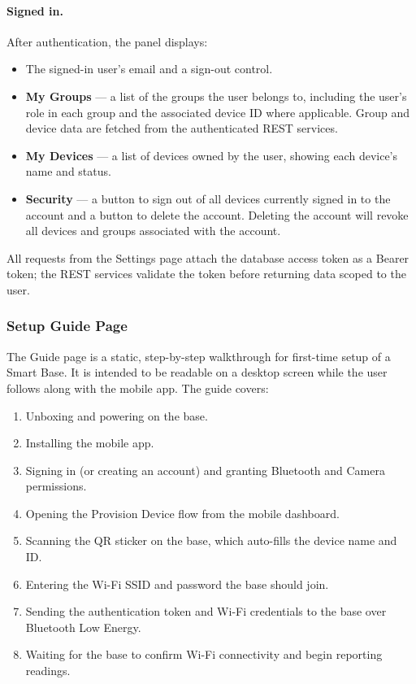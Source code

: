 \paragraph{Signed in.}
After authentication, the panel displays:
\begin{itemize}
    \item The signed-in user's email and a sign-out control.
    \item \textbf{My Groups} --- a list of the groups the user belongs to, including the user's role in each group and the associated device ID where applicable. Group and device data are fetched from the authenticated REST services.
    \item \textbf{My Devices} --- a list of devices owned by the user, showing each device's name and status.
    \item \textbf{Security} --- a button to sign out of all devices currently signed in to the account and a button to delete the account. Deleting the account will revoke all devices and groups associated with the account.
\end{itemize}

\noindent All requests from the Settings page attach the database access token as a Bearer token; the REST services validate the token before returning data scoped to the user.

\subsubsection{Setup Guide Page}
The Guide page is a static, step-by-step walkthrough for first-time setup of a Smart Base. It is intended to be readable on a desktop screen while the user follows along with the mobile app. The guide covers:

\begin{enumerate}
    \item Unboxing and powering on the base.
    \item Installing the mobile app.
    \item Signing in (or creating an account) and granting Bluetooth and Camera permissions.
    \item Opening the Provision Device flow from the mobile dashboard.
    \item Scanning the QR sticker on the base, which auto-fills the device name and ID.
    \item Entering the Wi-Fi SSID and password the base should join.
    \item Sending the authentication token and Wi-Fi credentials to the base over Bluetooth Low Energy.
    \item Waiting for the base to confirm Wi-Fi connectivity and begin reporting readings.
\end{enumerate}

